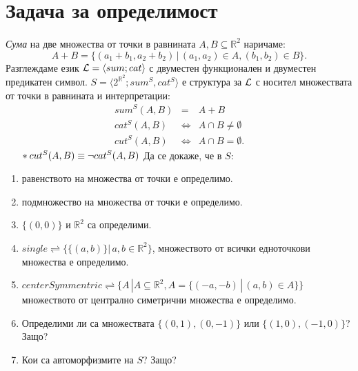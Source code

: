 \documentclass[12pt]{article}
\begin{document}
\newpage
\section{Задача за определимост}
\paragraph{}
\emph{Сума} на две множества от точки в равнината $A, B\subseteq \mathbb{R}^2$ наричаме:
\begin{equation*}
A+B = \{(a_1+b_1,a_2+b_2) \,|\, (a_1,a_2)\in A, (b_1,b_2)\in B\}.
\end{equation*}
Разглеждаме език ${\cal L}=\langle sum;cat\rangle$ с двуместен функционален и двуместен предикатен
символ. $S=\langle2^{\mathbb{R}^2}; sum^S,cat^S\rangle$ е структура за ${\cal L}$ с носител множествата
от точки в равнината и интерпретации:
\begin{eqnarray*}
sum^S(A,B) &=& A + B\\
cat^S(A,B) &\iff & A\cap B\neq \emptyset\\
cut^S(A,B) &\iff & A\cap B = \emptyset.
\end{eqnarray*}
$\indent *cut^S(A,B) \equiv \neg cat^S(A,B)\\$
Да се докаже, че в $S$:
\begin{enumerate}
\item равенството на множества от точки е определимо.
\item подмножество на множества от точки е определимо.
\item $\{(0,0)\}$ и $\mathbb{R}^2$ са определими.
\item $single \rightleftharpoons \{\{(a,b)\}|\,a,b \in \mathbb{R}^2\}$, множеството от всички едноточкови множества е определимо.
\item $centerSymmentric \rightleftharpoons \{A\,|A \subseteq \mathbb{R}^2, A = \{(-a, -b)\,|\,(a,b)\in A\}\}$ множеството от централно симетрични множества е определимо.
\item Определими ли са множествата $\{(0,1),(0,-1)\}$ или $\{(1,0),(-1,0)\}$? Защо? 
\item Кои са автоморфизмите на $S$? Защо?
\end{enumerate}
\newpage
\end{document}

